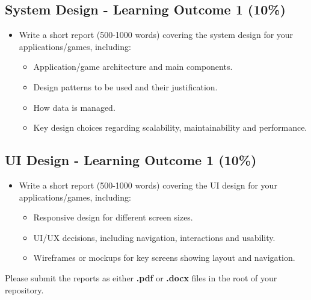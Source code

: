 \documentclass{article}
\begin{document}
	\subsection*{System Design - Learning Outcome 1 (10\%)}
	\begin{itemize}
	  \item Write a short report (500-1000 words) covering the system design for your applications/games, including:
	  \begin{itemize}
		\item Application/game architecture and main components.
		\item Design patterns to be used and their justification.
		\item How data is managed.
		\item Key design choices regarding scalability, maintainability and performance.
	  \end{itemize}
	\end{itemize}
	
	\subsection*{UI Design - Learning Outcome 1 (10\%)}
	\begin{itemize}
	  \item Write a short report (500-1000 words) covering the UI design for your applications/games, including:
	  \begin{itemize}
		\item Responsive design for different screen sizes.
		\item UI/UX decisions, including navigation, interactions and usability.
		\item Wireframes or mockups for key screens showing layout and navigation.
	  \end{itemize}
	\end{itemize}

	Please submit the reports as either \textbf{.pdf} or \textbf{.docx} files in the root of your repository.
\end{document}
